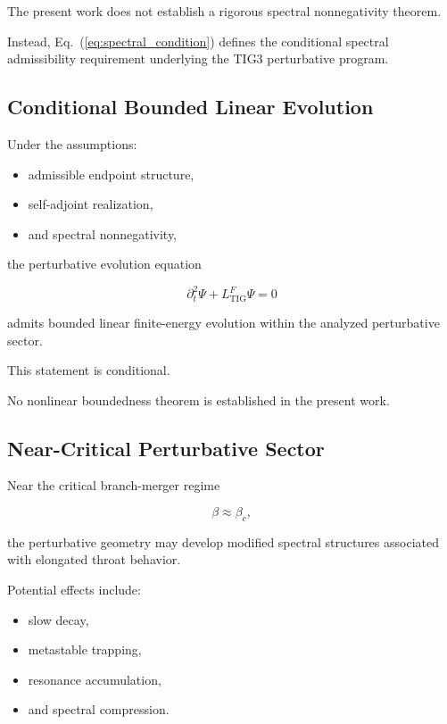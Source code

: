 The present work does not establish a rigorous spectral nonnegativity theorem.

Instead, Eq.~(\ref{eq:spectral_condition}) defines the conditional spectral admissibility requirement underlying the TIG3 perturbative program.


\subsection{Conditional Bounded Linear Evolution}

Under the assumptions:
\begin{itemize}[leftmargin=0.6cm]
\item admissible endpoint structure,
\item self-adjoint realization,
\item and spectral nonnegativity,
\end{itemize}

the perturbative evolution equation

\begin{equation}
\partial_t^2 \Psi
+
L_{\mathrm{TIG}}^{F}\Psi
=
0
\end{equation}

admits bounded linear finite-energy evolution within the analyzed perturbative sector.

This statement is conditional.

No nonlinear boundedness theorem is established in the present work.


\subsection{Near-Critical Perturbative Sector}

Near the critical branch-merger regime

\begin{equation}
\beta \approx \beta_c,
\end{equation}

the perturbative geometry may develop modified spectral structures associated with elongated throat behavior.

Potential effects include:
\begin{itemize}[leftmargin=0.6cm]
\item slow decay,
\item metastable trapping,
\item resonance accumulation,
\item and spectral compression.
\end{itemize}

